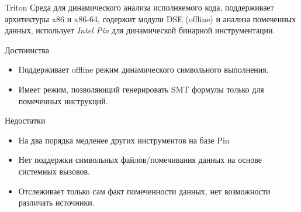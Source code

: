 \documentclass[10pt]{beamer}
\begin{document}
\begin{frame}{Triton}
    Среда для динамического анализа исполняемого кода, поддерживает архитектуры x86 и x86-64, содержит модули DSE (offline) и анализа помеченных данных, использует \emph{Intel Pin} для динамической бинарной инструментации.
    \begin{block}{Достоинства}
        \begin{itemize}
        \item Поддерживает offline режим динамического символьного выполнения.
        \item Имеет режим, позволяющий генерировать SMT формулы только для помеченных инструкций.
        \end{itemize}
    \end{block}

      \begin{block}{Недостатки}
          \begin{itemize}
      \item На два порядка медленее других инструментов на базе Pin
      \item Нет поддержки символьных файлов/помечивания данных на основе системных вызовов.
      \item Отслеживает только сам факт помеченности данных, нет возможности различать источники.
      \end{itemize}
    \end{block}

\end{frame}

\end{document}
